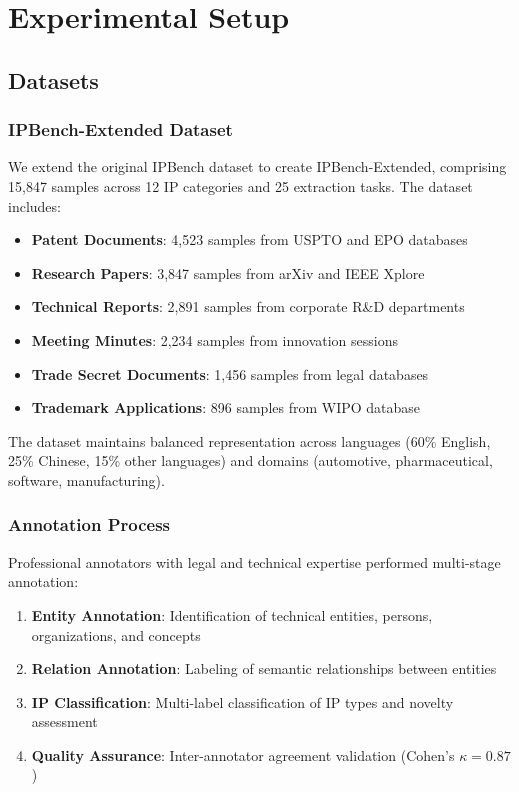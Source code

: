 \documentclass[11pt,a4paper]{article}
\begin{document}
\section{Experimental Setup}

\subsection{Datasets}

\subsubsection{IPBench-Extended Dataset}

We extend the original IPBench dataset \citep{wang2025ipbench} to create IPBench-Extended, comprising 15,847 samples across 12 IP categories and 25 extraction tasks. The dataset includes:

\begin{itemize}
  \item \textbf{Patent Documents}: 4,523 samples from USPTO and EPO databases
  \item \textbf{Research Papers}: 3,847 samples from arXiv and IEEE Xplore
  \item \textbf{Technical Reports}: 2,891 samples from corporate R\&D departments
  \item \textbf{Meeting Minutes}: 2,234 samples from innovation sessions
  \item \textbf{Trade Secret Documents}: 1,456 samples from legal databases
  \item \textbf{Trademark Applications}: 896 samples from WIPO database
\end{itemize}

The dataset maintains balanced representation across languages (60\% English, 25\% Chinese, 15\% other languages) and domains (automotive, pharmaceutical, software, manufacturing).

\subsubsection{Annotation Process}

Professional annotators with legal and technical expertise performed multi-stage annotation:

\begin{enumerate}
  \item \textbf{Entity Annotation}: Identification of technical entities, persons, organizations, and concepts
  \item \textbf{Relation Annotation}: Labeling of semantic relationships between entities
  \item \textbf{IP Classification}: Multi-label classification of IP types and novelty assessment
  \item \textbf{Quality Assurance}: Inter-annotator agreement validation (Cohen's $\kappa = 0.87$)
\end{enumerate}
\end{document}
